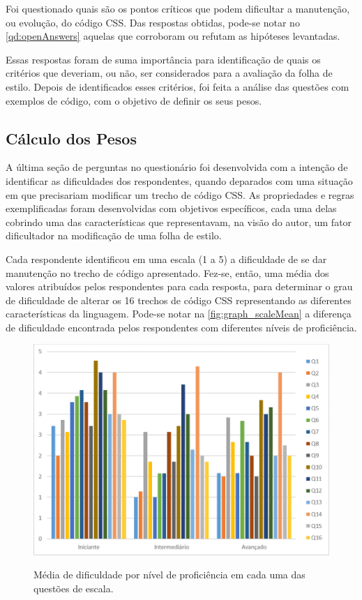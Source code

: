 Foi questionado quais são os pontos críticos que podem dificultar a manutenção, ou evolução, do código CSS. Das respostas obtidas, pode-se notar no \autoref{qd:openAnswers} aquelas que corroboram ou refutam as hipóteses levantadas.



Essas respostas foram de suma importância para identificação de quais os critérios que deveriam, ou não, ser considerados para a avaliação da folha de estilo. Depois de identificados esses critérios, foi feita a análise das questões com exemplos de código, com o objetivo de definir os seus pesos.

\subsection{Cálculo dos Pesos}

A última seção de perguntas no questionário foi desenvolvida com a intenção de identificar as dificuldades dos respondentes, quando deparados com uma situação em que precisariam modificar um trecho de código CSS. As propriedades e regras exemplificadas foram desenvolvidas com objetivos específicos, cada uma delas cobrindo uma das características que representavam, na visão do autor, um fator dificultador na modificação de uma folha de estilo.

Cada respondente identificou em uma escala (1 a 5) a dificuldade de se dar manutenção no trecho de código apresentado. Fez-se, então, uma média dos valores atribuídos pelos respondentes para cada resposta, para determinar o grau de dificuldade de alterar os 16 trechos de código CSS representando as diferentes características da linguagem. Pode-se notar na \autoref{fig:graph_scaleMean} a diferença de dificuldade encontrada pelos respondentes com diferentes níveis de proficiência.

\begin{figure}[!htb]
	\centering
	\caption{Média de dificuldade por nível de proficiência em cada uma das questões de escala.}
	\includegraphics[width=1\textwidth]{./04-figuras/graph_scaleMean}
	\label{fig:graph_scaleMean}
\end{figure}

